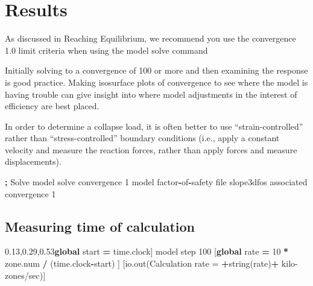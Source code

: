 \documentclass[a4paper, nobind]{templates/ociamthesis}
\newenvironment{Shaded}{\begin{snugshade}}{\end{snugshade}}
\newcommand{\BuiltInTok}[1]{#1}
\newcommand{\DecValTok}[1]{\textcolor[rgb]{0.00,0.00,0.81}{#1}}
\newcommand{\KeywordTok}[1]{\textcolor[rgb]{0.13,0.29,0.53}{\textbf{#1}}}
\newcommand{\NormalTok}[1]{#1}
\newcommand{\OperatorTok}[1]{\textcolor[rgb]{0.81,0.36,0.00}{\textbf{#1}}}
\newcommand{\StringTok}[1]{\textcolor[rgb]{0.31,0.60,0.02}{#1}}
\renewenvironment{Shaded}
{
  \vspace{10pt}%
  \begin{snugshade}%
}{%
  \end{snugshade}%
  \vspace{8pt}%
}
\begin{document}
\hypertarget{results-1}{%
\section{Results}\label{results-1}}

As discussed in Reaching Equilibrium, we recommend you use the convergence 1.0 limit criteria when using the model solve command

Initially solving to a convergence of 100 or more and then examining the response is good practice. Making isosurface plots of convergence to see where the model is having trouble can give insight into where model adjustments in the interest of efficiency are best placed.

In order to determine a collapse load, it is often better to use
``strain-controlled'' rather than ``stress-controlled'' boundary conditions (i.e., apply a constant velocity and measure the reaction forces, rather than apply forces and measure displacements).

\begin{Shaded}
\begin{Highlighting}[]
\OperatorTok{;}\NormalTok{ Solve}
\NormalTok{model solve convergence }\DecValTok{1}
\NormalTok{model factor}\OperatorTok{{-}}\NormalTok{of}\OperatorTok{{-}}\NormalTok{safety }\BuiltInTok{file} \StringTok{\textquotesingle{}slope3dfos\textquotesingle{}}\NormalTok{ associated convergence }\DecValTok{1}
\end{Highlighting}
\end{Shaded}

\hypertarget{measuring-time-of-calculation}{%
\subsection{Measuring time of calculation}\label{measuring-time-of-calculation}}

\begin{Shaded}
\begin{Highlighting}[]
\NormalTok{[}\KeywordTok{global}\NormalTok{ start }\OperatorTok{=}\NormalTok{ time.clock]}
\NormalTok{model step }\DecValTok{100}
\NormalTok{[}\KeywordTok{global}\NormalTok{ rate }\OperatorTok{=} \DecValTok{10} \OperatorTok{*}\NormalTok{ zone.num }\OperatorTok{/}\NormalTok{ (time.clock}\OperatorTok{{-}}\NormalTok{start) ]}
\NormalTok{[io.out(}\StringTok{\textquotesingle{}Calculation rate = \textquotesingle{}}\OperatorTok{+}\NormalTok{string(rate)}\OperatorTok{+}\StringTok{\textquotesingle{} kilo{-}zones/sec\textquotesingle{}}\NormalTok{)]}
\end{Highlighting}
\end{Shaded}
\end{document}
